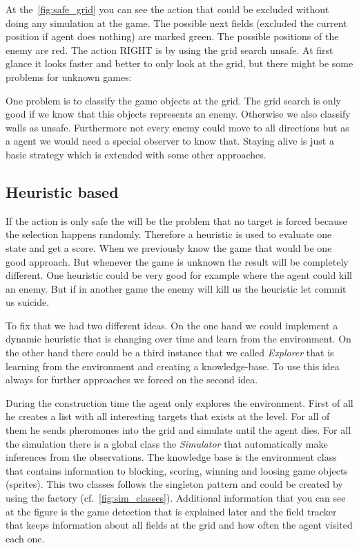 At the~\cref{fig:safe_grid} you can see the action that could be excluded without doing any simulation at the game.
The possible next fields (excluded the current position if agent does nothing) are marked green. The possible positions
of the enemy are red. The action RIGHT is by using the grid search unsafe. 
At first glance it looks faster and better to only look at the grid, but there might be some problems for unknown games:

One problem is to classify the game objects at the grid. The grid search is only good if we know that this objects represents an enemy. Otherwise we also classify walls as unsafe.
Furthermore not every enemy could move to all directions but as a agent we would need a special observer to know that.
Staying alive is just a basic strategy which is extended with some other approaches.




\subsection{Heuristic based} 
 
If the action is only safe the will be the problem that no target is forced because the selection happens randomly.
Therefore a heuristic is used to evaluate one state and get a score. When we previously know the game
that would be one good approach. But whenever the game is unknown the result will be completely different.
One heuristic could be very good for example where the agent could kill an enemy. But if in another game
the enemy will kill us the heuristic let commit us suicide.

To fix that we had two different ideas. On the one hand we could implement a dynamic heuristic that is changing over time
and learn from the environment. On the other hand there could be a third instance that we called \textit{Explorer} 
that is learning from the environment and creating a knowledge-base. 
To use this idea always for further approaches we forced on the second idea.

During the construction time the agent only explores the environment. 
First of all he creates a list with all interesting targets that exists at the level. For all of them he sends pheromones into the grid
and simulate until the agent dies. 
For all the simulation there is a global class the \textit{Simulator} that automatically make inferences from the observations.
The knowledge base is the environment class that contains information to blocking, scoring, winning and loosing game objects (sprites).
This two classes follows the singleton pattern and could be created by using the factory (cf.~\cref{fig:sim_classes}).
Additional information that you can see at the figure is the game detection that is explained later and the field tracker that keeps 
information about all fields at the grid and how often the agent visited each one.

